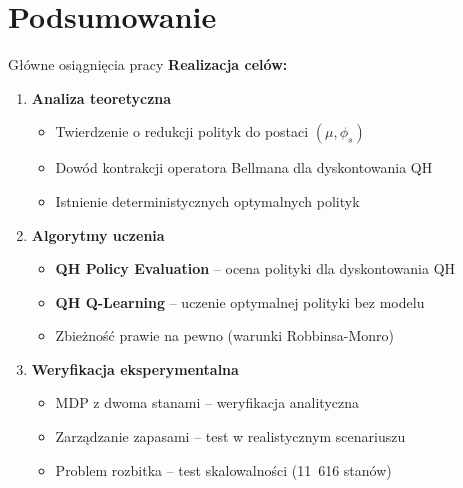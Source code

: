\section{Podsumowanie}

\begin{frame}{Główne osiągnięcia pracy}
\textbf{Realizacja celów:}

\begin{enumerate}
    \item \textbf{Analiza teoretyczna}
    \begin{itemize}
        \item Twierdzenie o redukcji polityk do postaci $(\mu, \phi_s)$
        \item Dowód kontrakcji operatora Bellmana dla dyskontowania QH
        \item Istnienie deterministycznych optymalnych polityk
    \end{itemize}
    
    \vspace{0.3em}
    \item \textbf{Algorytmy uczenia}
    \begin{itemize}
        \item \textbf{QH Policy Evaluation} -- ocena polityki dla dyskontowania QH
        \item \textbf{QH Q-Learning} -- uczenie optymalnej polityki bez modelu
        \item Zbieżność prawie na pewno (warunki Robbinsa-Monro)
    \end{itemize}
    
    \vspace{0.3em}
    \item \textbf{Weryfikacja eksperymentalna}
    \begin{itemize}
        \item MDP z dwoma stanami -- weryfikacja analityczna
        \item Zarządzanie zapasami -- test w realistycznym scenariuszu
        \item Problem rozbitka -- test skalowalności (11~616 stanów)
    \end{itemize}
\end{enumerate}
\end{frame}


